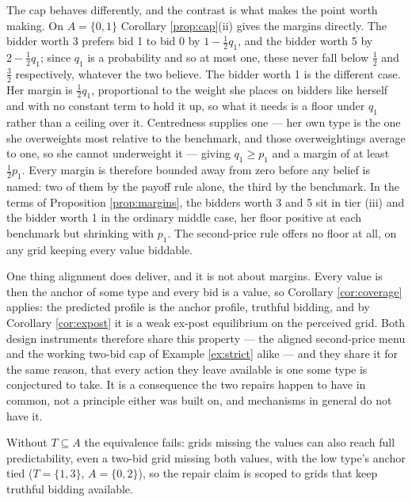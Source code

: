 \documentclass[12pt]{article}
\theoremstyle{definition}
\begin{document}
The cap behaves differently, and the contrast is what makes the point worth making. On $A = \{0,1\}$ Corollary \ref{prop:cap}(ii) gives the margins directly. The bidder worth 3 prefers bid 1 to bid 0 by $1 - \tfrac12 q_1$, and the bidder worth 5 by $2 - \tfrac12 q_1$; since $q_1$ is a probability and so at most one, these never fall below $\tfrac12$ and $\tfrac32$ respectively, whatever the two believe. The bidder worth 1 is the different case. Her margin is $\tfrac12 q_1$, proportional to the weight she places on bidders like herself and with no constant term to hold it up, so what it needs is a floor under $q_1$ rather than a ceiling over it. Centredness supplies one --- her own type is the one she overweights most relative to the benchmark, and those overweightings average to one, so she cannot underweight it --- giving $q_1 \ge p_1$ and a margin of at least $\tfrac12 p_1$. Every margin is therefore bounded away from zero before any belief is named: two of them by the payoff rule alone, the third by the benchmark. In the terms of Proposition \ref{prop:margins}, the bidders worth 3 and 5 sit in tier (iii) and the bidder worth 1 in the ordinary middle case, her floor positive at each benchmark but shrinking with $p_1$. The second-price rule offers no floor at all, on any grid keeping every value biddable.

One thing alignment does deliver, and it is not about margins. Every value is then the anchor of some type and every bid is a value, so Corollary \ref{cor:coverage} applies: the predicted profile is the anchor profile, truthful bidding, and by Corollary \ref{cor:expost} it is a weak ex-post equilibrium on the perceived grid. Both design instruments therefore share this property --- the aligned second-price menu and the working two-bid cap of Example \ref{ex:strict} alike --- and they share it for the same reason, that every action they leave available is one some type is conjectured to take. It is a consequence the two repairs happen to have in common, not a principle either was built on, and mechanisms in general do not have it.

Without $T \subseteq A$ the equivalence fails: grids missing the values can also reach full predictability, even a two-bid grid missing both values, with the low type's anchor tied ($T = \{1,3\}$, $A = \{0,2\}$), so the repair claim is scoped to grids that keep truthful bidding available.
\end{document}
